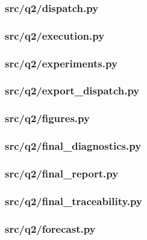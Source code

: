 \documentclass[zihao=-4,a4paper,UTF8,fontset=none]{ctexart}
\begin{document}
\subsubsection*{src/q2/dispatch.py}


\subsubsection*{src/q2/execution.py}


\subsubsection*{src/q2/experiments.py}


\subsubsection*{src/q2/export\_dispatch.py}


\subsubsection*{src/q2/figures.py}


\subsubsection*{src/q2/final\_diagnostics.py}


\subsubsection*{src/q2/final\_report.py}


\subsubsection*{src/q2/final\_traceability.py}


\subsubsection*{src/q2/forecast.py}

\end{document}
